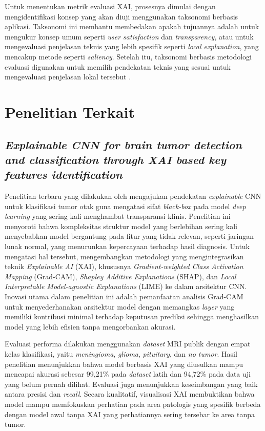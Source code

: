 Untuk menentukan metrik evaluasi XAI, prosesnya dimulai dengan mengidentifikasi konsep yang akan diuji menggunakan taksonomi berbasis aplikasi. Taksonomi ini membantu membedakan apakah tujuannya adalah untuk mengukur konsep umum seperti \textit{user satisfaction} dan \textit{transparency}, atau untuk mengevaluasi penjelasan teknis yang lebih spesifik seperti \textit{local explanation}, yang mencakup metode seperti \textit{saliency}. Setelah itu, taksonomi berbasis metodologi evaluasi digunakan untuk memilih pendekatan teknis yang sesuai untuk mengevaluasi penjelasan lokal tersebut \autocite{kadir2023evaluation}.

\section{Penelitian Terkait}
\subsection{\textit{Explainable CNN for brain tumor detection and classification through XAI based key features identification}}
Penelitian terbaru yang dilakukan oleh \textcite{Iftikhar2025ExplainableCNN} mengajukan pendekatan \textit{explainable} CNN untuk klasifikasi tumor otak guna mengatasi sifat \textit{black-box} pada model \textit{deep learning} yang sering kali menghambat transparansi klinis. Penelitian ini menyoroti bahwa kompleksitas struktur model yang berlebihan sering kali menyebabkan model bergantung pada fitur yang tidak relevan, seperti jaringan lunak normal, yang menurunkan kepercayaan terhadap hasil diagnosis. Untuk mengatasi hal tersebut, \textcite{Iftikhar2025ExplainableCNN} mengembangkan metodologi yang mengintegrasikan teknik \textit{Explainable AI} (XAI), khususnya \textit{Gradient-weighted Class Activation Mapping} (Grad-CAM), \textit{Shapley Additive Explanations} (SHAP), dan \textit{Local Interpretable Model-agnostic Explanations} (LIME) ke dalam arsitektur CNN. Inovasi utama dalam penelitian ini adalah pemanfaatan analisis Grad-CAM untuk menyederhanakan arsitektur model dengan memangkas \textit{layer} yang memiliki kontribusi minimal terhadap keputusan prediksi sehingga menghasilkan model yang lebih efisien tanpa mengorbankan akurasi.

Evaluasi performa dilakukan menggunakan \textit{dataset} MRI publik dengan empat kelas klasifikasi, yaitu \textit{meningioma}, \textit{glioma}, \textit{pituitary}, dan \textit{no tumor}. Hasil penelitian menunjukkan bahwa model berbasis XAI yang diusulkan mampu mencapai akurasi sebesar 99,21\% pada \textit{dataset} latih dan 94,72\% pada data uji yang belum pernah dilihat. Evaluasi juga menunjukkan keseimbangan yang baik antara presisi dan \textit{recall}. Secara kualitatif, visualisasi XAI membuktikan bahwa model mampu memfokuskan perhatian pada area patologis yang spesifik berbeda dengan model awal tanpa XAI yang perhatiannya sering tersebar ke area tanpa tumor.

